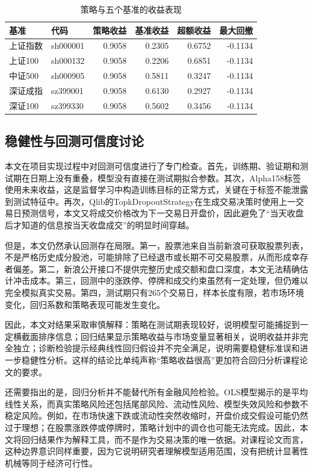 \documentclass[UTF8,a4paper,12pt]{ctexart}
\begin{document}
\begin{table}[H]
\centering
\caption{策略与五个基准的收益表现}
\label{tab:perf}
\begin{tabular}{llrrrr}
\toprule
基准 & 代码 & 策略收益 & 基准收益 & 超额收益 & 最大回撤 \\
\midrule
上证指数 & sh000001 & 0.9058 & 0.2305 & 0.6752 & -0.1134 \\
上证100 & sh000132 & 0.9058 & 0.2206 & 0.6851 & -0.1134 \\
中证500 & sh000905 & 0.9058 & 0.5811 & 0.3247 & -0.1134 \\
深证成指 & sz399001 & 0.9058 & 0.6130 & 0.2927 & -0.1134 \\
深证100 & sz399330 & 0.9058 & 0.5602 & 0.3456 & -0.1134 \\
\bottomrule
\end{tabular}
\end{table}

\subsection{稳健性与回测可信度讨论}
本文在项目实现过程中对回测可信度进行了专门检查。首先，训练期、验证期和测试期在日期上没有重叠，模型没有直接在测试期拟合参数。其次，Alpha158标签使用未来收益，这是监督学习中构造训练目标的正常方式，关键在于标签不能泄露到测试特征中。再次，Qlib的TopkDropoutStrategy在生成交易决策时使用上一交易日预测信号，本文又将成交价格改为下一交易日开盘价，因此避免了“当天收盘后才知道的信息按当天收盘成交”的明显时间穿越。

但是，本文仍然承认回测存在局限。第一，股票池来自当前新浪可获取股票列表，不是严格历史成分股池，可能排除了已经退市或长期不可交易股票，从而形成幸存者偏差。第二，新浪公开接口不提供完整历史成交额和盘口深度，本文无法精确估计冲击成本。第三，回测中的涨跌停、停牌和成交约束虽然有一定处理，但仍难以完全模拟真实交易。第四，测试期只有265个交易日，样本长度有限，若市场环境变化，回归系数和策略表现可能发生变化。

因此，本文对结果采取审慎解释：策略在测试期表现较好，说明模型可能捕捉到一定横截面排序信息；回归结果显示策略收益与市场变量显著相关，说明收益并非完全独立；诊断检验提示经典线性回归假设并不完全满足，说明需要稳健标准误和进一步稳健性分析。这样的结论比单纯声称“策略收益很高”更加符合回归分析课程论文的要求。

还需要指出的是，回归分析并不能替代所有金融风险检验。OLS模型揭示的是平均线性关系，而真实策略风险还包括尾部风险、流动性风险、模型失效风险和参数不稳定风险。例如，在市场快速下跌或流动性突然收缩时，开盘价成交假设可能仍然过于理想；在股票涨跌停或停牌时，策略计划中的调仓也可能无法完成。因此，本文将回归结果作为解释工具，而不是作为交易决策的唯一依据。对课程论文而言，这种边界意识同样重要，因为它说明研究者理解模型适用范围，没有把统计显著性机械等同于经济可行性。
\end{document}
